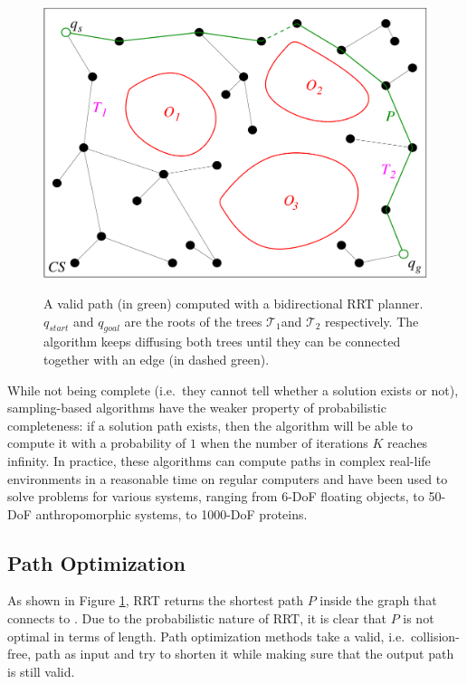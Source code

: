\begin{figure}
  \centering
      {\includegraphics[width = 0.8\linewidth]
        {src/chap1-path-optimization/rrt.pdf}}
      \caption[A valid path computed with a bidirectional RRT
        planner.]{A valid path (in green) computed with a
        bidirectional RRT planner. $q_{start}$ and $q_{goal}$ are the
        roots of the trees $\mathcal{T}_{1}$and $\mathcal{T}_{2}$
        respectively. The algorithm keeps diffusing both trees until
        they can be connected together with an edge (in dashed
        green).}
      \label{fig:chap1-rrt}
\end{figure}

While not being complete (i.e.\ they cannot tell whether a solution
exists or not), sampling-based algorithms have the weaker property of
probabilistic completeness: if a solution path exists, then the
algorithm will be able to compute it with a probability of $1$ when
the number of iterations $K$ reaches infinity. In practice, these
algorithms can compute paths in complex real-life environments in a
reasonable time on regular computers and have been used to solve
problems for various systems, ranging from 6-DoF floating objects, to
50-DoF anthropomorphic systems, to 1000-DoF proteins.

\subsection{Path Optimization}
\label{subsec:chap1-path-optimization}

As shown in Figure \ref{fig:chap1-rrt}, RRT returns the shortest path
$P$ inside the graph that connects  to . Due to
the probabilistic nature of RRT, it is clear that $P$ is not optimal
in terms of length. Path optimization methods take a valid,
i.e.\ collision-free, path as input and try to shorten it while making
sure that the output path is still valid.

